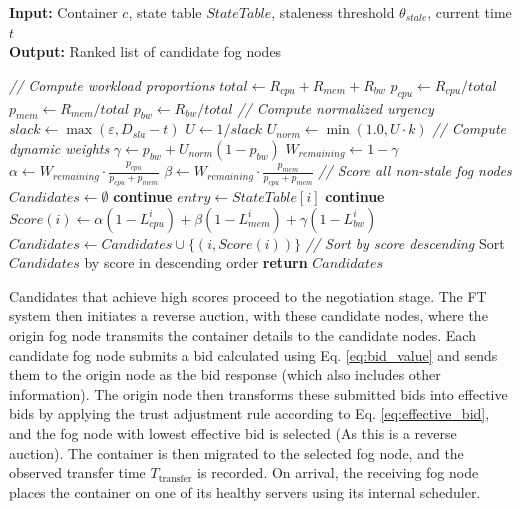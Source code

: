 \documentclass{article}
\begin{document}
\begin{algorithm}[h!]
\caption{Dynamic Scoring of Fog Nodes for Container Migration}
\label{alg:scoring}
 \textbf{Input:} Container $c$, state table $StateTable$, staleness threshold $\theta_{stale}$, current time $t$
\\ \textbf{Output:} Ranked list of candidate fog nodes
\begin{algorithmic}[1]
\State \textit{// Compute workload proportions}
\State $total \gets R_{cpu} + R_{mem} + R_{bw}$
\State $p_{cpu} \gets R_{cpu} / total$
\State $p_{mem} \gets R_{mem} / total$
\State $p_{bw} \gets R_{bw} / total$
\State
\State \textit{// Compute normalized urgency}
\State $slack \gets \max(\varepsilon, D_{sla} - t)$
\State $U \gets 1 / slack$
\State $U_{norm} \gets \min(1.0, U \cdot k)$ 
\State
\State \textit{// Compute dynamic weights}
\State $\gamma \gets p_{bw} + U_{norm}(1 - p_{bw})$
\State $W_{remaining} \gets 1 - \gamma$
\State $\alpha \gets W_{remaining} \cdot \frac{p_{cpu}}{p_{cpu} + p_{mem}}$
\State $\beta \gets W_{remaining} \cdot \frac{p_{mem}}{p_{cpu} + p_{mem}}$
\State
\State \textit{// Score all non-stale fog nodes}
\State $Candidates \gets \emptyset$
        \State \textbf{continue}
    \EndIf
    \State $entry \gets StateTable[i]$
        \State \textbf{continue} 
    \EndIf
    \State $Score(i) \gets \alpha(1 - L^{i}_{cpu}) + \beta(1 - L^{i}_{mem}) + \gamma(1 - L^{i}_{bw})$
    \State $Candidates \gets Candidates \cup \{(i, Score(i))\}$
\EndFor
\State
\State \textit{// Sort by score descending}
\State Sort $Candidates$ by score in descending order
\State \textbf{return} $Candidates$
\end{algorithmic}
\end{algorithm}

Candidates that achieve high scores proceed to the negotiation stage. The FT system then initiates a reverse auction, with these candidate nodes, where the origin fog node transmits the container details to the candidate nodes. Each candidate fog node submits a bid calculated using Eq. \ref{eq:bid_value} and sends them to the origin node as the bid response (which also includes other information). The origin node then transforms these submitted bids into effective bids by applying the trust adjustment rule according to Eq. \ref{eq:effective_bid}, and the fog node with lowest effective bid is selected (As this is a reverse auction). The container is then migrated to the selected fog node, and the observed transfer time $T_{\text{transfer}}$ is recorded. On arrival, the receiving fog node places the container on one of its healthy servers using its internal scheduler.
\end{document}

